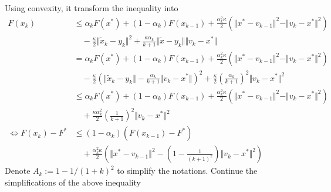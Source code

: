 \documentclass[12pt]{article}
\begin{document}
        Using convexity, it transform the inequality into 
        \begin{align*}
            F(x_k) &\le 
            \alpha_k F(x^*) + (1 - \alpha_k) F(x_{k - 1}) 
            + \frac{\alpha_k^2\kappa}{2}\left(
                \Vert x^* - v_{k - 1}\Vert^2 - 
                \Vert v_k - x^*\Vert^2
            \right)
            \\
            &\quad 
                - \frac{\kappa}{2}\Vert \tilde x_k - y_k\Vert^2 
                + \frac{\kappa \alpha_k}{k + 1}\Vert \tilde x - y_k\Vert\Vert v_k - x^*\Vert
            \\
            &=
            \alpha_k F(x^*) + (1 - \alpha_k) F(x_{k - 1}) 
            + \frac{\alpha_k^2\kappa}{2}\left(
                \Vert x^* - v_{k - 1}\Vert^2 - 
                \Vert v_k - x^*\Vert^2
            \right)
                \\
                &\quad 
                - \frac{\kappa}{2}\left(
                    \Vert \tilde x_k - y_k\Vert
                    - \frac{\alpha_k}{k + 1}\Vert v_k - x^*\Vert
                \right)^2 
                + \frac{\kappa}{2}\left(\frac{\alpha_k}{k + 1}\right)^2\Vert v_k - x^*\Vert^2
            \\ 
            &\le 
            \alpha_k F(x^*) + (1 - \alpha_k) F(x_{k - 1}) 
            + \frac{\alpha_k^2 \kappa}{2}\left(
                \Vert x^* - v_{k - 1}\Vert^2 - 
                \Vert v_k - x^*\Vert^2
            \right)
                \\
                &\quad  
                + \frac{\kappa \alpha_k^2}{2}\left(\frac{1}{k + 1}\right)^2\Vert v_k - x^*\Vert^2
            \\
            \iff 
            F(x_k) - F^*
            &\le 
            (1 - \alpha_k)(F(x_{k - 1}) - F^*)
            \\ &\quad 
                + 
                \frac{\alpha_k^2\kappa}{2}
                \left(
                    \Vert x^* - v_{k - 1}\Vert^2
                    - \left(
                        1 - \frac{1}{(k + 1)^2}
                    \right)\Vert v_k - x^*\Vert^2
                \right)
        \end{align*}
        Denote $A_k := 1 - 1/(1 + k)^2$ to simplify the notations. 
        Continue the simplifications of the above inequality
\end{document}
